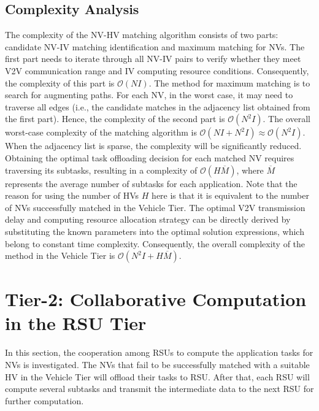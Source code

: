 \documentclass[lettersize,journal]{IEEEtran}
\begin{document}
\subsection{Complexity Analysis}
The complexity of the NV-HV matching algorithm consists of two parts: candidate NV-IV matching identification and maximum matching for NVs. The first part needs to iterate through all NV-IV pairs to verify whether they meet V2V communication range and IV computing resource conditions. Consequently, the complexity of this part is $\mathcal{O}\left( N I \right)$. The method for maximum matching is to search for augmenting paths. For each NV, in the worst case, it may need to traverse all edges (i.e., the candidate matches in the adjacency list obtained from the first part). Hence, the complexity of the second part is $\mathcal{O}\left( N^2I \right)$. The overall worst-case complexity of the matching algorithm is $\mathcal{O}\left( NI+N^2I \right) 
\approx \mathcal{O}\left( N^2I \right)$. When the adjacency list is sparse, the complexity will be significantly reduced. Obtaining the optimal task offloading decision for each matched NV requires traversing its subtasks, resulting in a complexity of $\mathcal{O}\left( H \overline{M} \right)$, where $\overline{M}$ represents the average number of subtasks for each application. Note that the reason for using the number of HVs $H$ here is that it is equivalent to the number of NVs successfully matched in the Vehicle Tier. The optimal V2V transmission delay and computing resource allocation strategy can be directly derived by substituting the known parameters into the optimal solution expressions, which belong to constant time complexity. Consequently, the overall complexity of the method in the Vehicle Tier is $\mathcal{O}\left( N^2 I + H \overline{M} \right)$.




\section{Tier-2: Collaborative Computation in the RSU Tier}

In this section, the cooperation among RSUs to compute the application tasks for NVs is investigated. The NVs that fail to be successfully matched with a suitable HV in the Vehicle Tier will offload their tasks to RSU. After that, each RSU will compute several subtasks and transmit the intermediate data to the next RSU for further computation.
\end{document}
